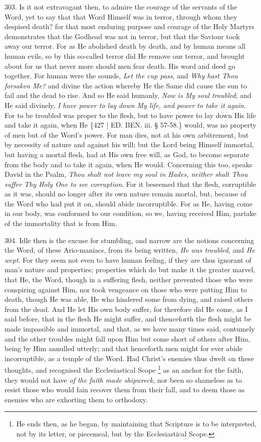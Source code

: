303. Is it not
extravagant then, to admire the courage of the servants of the Word,
yet to say that that Word Himself was in terror, through whom they
despised death? for that most enduring purpose and courage of the Holy
Martyrs demonstrates that the Godhead was not in terror, but that the
Saviour took away our terror. For as He abolished death by death, and
by human means all human evils, so by this so-called terror did He
remove our terror, and brought about for us that never more should men
fear death. His word and deed go together. For human were the sounds, \emph{Let
the cup pass}, and \emph{Why hast Thou forsaken Me?} and divine the
action whereby He the Same did cause the sun to fail and the dead to
rise. And so He said humanly, \emph{Now is My soul troubled}; and He
said divinely, \emph{I have power to lay down My life, and power to take
it again}. For to be troubled was proper to the flesh, but to have
power to lay down His life and take it again, when He \{427 | ED. BEN. iii. § 57-58.\}
would, was no property of men but of the Word's power. For man dies,
not at his own arbitrement, but by necessity of nature and against his
will; but the Lord being Himself immortal, but having a mortal flesh,
had at His own free will, as God, to become separate from the body and
to take it again, when He would. Concerning this too, speaks David in
the Psalm, \emph{Thou shalt not leave my soul in Hades, neither shalt
Thou suffer Thy Holy One to see corruption}. For it beseemed that
the flesh, corruptible as it was, should no longer after its own
nature remain mortal, but, because of the Word who had put it on,
should abide incorruptible. For as He, having come in our body, was
conformed to our condition, so we, having received Him, partake of the
immortality that is from Him.

304.
Idle then is the excuse for stumbling, and narrow are the notions
concerning the Word, of these Ario-maniacs, from its being written, \emph{He
was troubled}, and \emph{He wept}. For they seem not even to have
human feeling, if they are thus ignorant of man's nature and
properties; properties which do but make it the greater marvel, that
He, the Word, though in a suffering flesh, neither prevented those who
were conspiring against Him, nor took vengeance on those who were
putting Him to death, though He was able, He who hindered some from
dying, and raised others from the dead. And He let His own body
suffer, for therefore did He come, as I said before, that in the flesh
He might suffer, and thenceforth the flesh might be made impassible
and immortal, and that, as we have many times said, contumely and the
other troubles might fall upon Him but come short of others after Him,
being by Him annulled utterly; and that henceforth men might for ever
abide incorruptible, as a temple of the Word. Had Christ's enemies
thus dwelt on these thoughts, and recognised the Ecclesiastical Scope
\footnote{He ends then, as he began, by maintaining that Scripture is to be
interpreted, not by its letter, or piecemeal, but by the
Ecclesiastical Scope.} as an anchor for the
faith, they would not have \emph{of the faith made shipwreck},
nor been so shameless as to resist those who would fain recover them
from their fall, and to deem those as enemies who are exhorting them
to orthodoxy.

